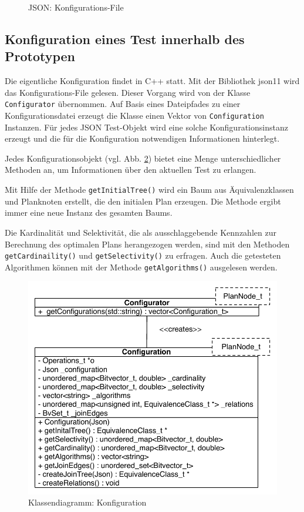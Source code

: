 \begin{figure}[ht]

\caption{JSON: Konfigurations-File}
\label{JsonConfigFile}
\end{figure}

\subsection{Konfiguration eines Test innerhalb des Prototypen}

Die eigentliche Konfiguration findet in C++ statt. Mit der Bibliothek json11 \cite{json11} wird das Konfigurations-File gelesen. Dieser Vorgang wird von der Klasse \texttt{Config\-urator} übernommen. Auf Basis eines Dateipfades zu einer Konfigurationsdatei erzeugt die Klasse einen Vektor von \texttt{Configuration} Instanzen. Für jedes JSON Test-Objekt wird eine solche Konfigurationsinstanz erzeugt und die für die Konfiguration notwendigen Informationen hinterlegt.

Jedes Konfigurationsobjekt (vgl. Abb. \ref{Konfiguration}) bietet eine Menge unterschiedlicher Methoden an, um Informationen über den aktuellen Test zu erlangen.

Mit Hilfe der Methode \texttt{getInitialTree()} wird ein Baum aus Äquivalenzklassen und Planknoten erstellt, die den initialen Plan erzeugen. Die Methode ergibt immer eine neue Instanz des gesamten Baums.

Die Kardinalität und Selektivität, die als ausschlaggebende Kennzahlen zur Berechnung des optimalen Plans herangezogen werden, sind mit den Methoden \texttt{get\-Cardinaility()} und \texttt{get\-Selectivity()} zu erfragen. Auch die getesteten Algorithmen können mit der Methode \texttt{getAlgorithms()} ausgelesen werden.


\begin{figure}[ht]
  \centering
  \includegraphics[scale=0.75]{04_Implementierung/00_media/ConfigurationClass.pdf}
  \caption{Klassendiagramm: Konfiguration}
  \label{Konfiguration}
\end{figure}

